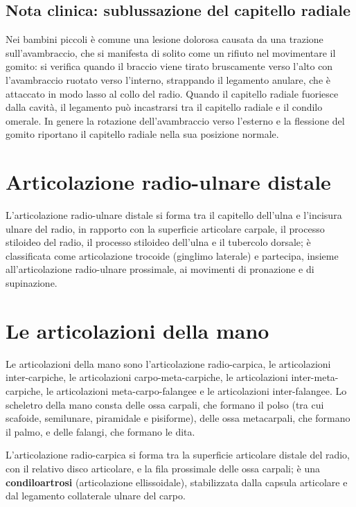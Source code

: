 \subsection{Nota clinica: sublussazione del capitello radiale}

Nei bambini piccoli è comune una lesione dolorosa causata da una trazione
sull'avambraccio, che si manifesta di solito come un rifiuto nel
movimentare il gomito: si verifica quando il braccio viene tirato
bruscamente verso l'alto con l'avambraccio ruotato verso l'interno,
strappando il legamento anulare, che è attaccato in modo lasso al collo
del radio. Quando il capitello radiale fuoriesce dalla cavità, il
legamento può incastrarsi tra il capitello radiale e il condilo omerale.
In genere la rotazione dell'avambraccio verso l'esterno e la flessione del
gomito riportano il capitello radiale nella sua posizione normale.

\section{Articolazione radio-ulnare distale}

L'articolazione radio-ulnare distale si forma tra il capitello dell'ulna e
l'incisura ulnare del radio, in rapporto con la superficie articolare
carpale, il processo stiloideo del radio, il processo stiloideo dell'ulna
e il tubercolo dorsale; è classificata come articolazione trocoide
(ginglimo laterale) e partecipa, insieme all'articolazione radio-ulnare
prossimale, ai movimenti di pronazione e di supinazione.

\section{Le articolazioni della mano}

Le articolazioni della mano sono l'articolazione radio-carpica, le
articolazioni inter-carpiche, le articolazioni carpo-meta-carpiche, le
articolazioni inter-meta-carpiche, le articolazioni meta-carpo-falangee e
le articolazioni inter-falangee. Lo scheletro della mano consta delle ossa
carpali, che formano il polso (tra cui scafoide, semilunare, piramidale e
pisiforme), delle ossa metacarpali, che formano il palmo, e delle falangi,
che formano le dita.

L'articolazione radio-carpica si forma tra la superficie articolare
distale del radio, con il relativo disco articolare, e la fila prossimale
delle ossa carpali; è una \textbf{condiloartrosi} (articolazione
ellissoidale), stabilizzata dalla capsula articolare e dal legamento
collaterale ulnare del carpo.

